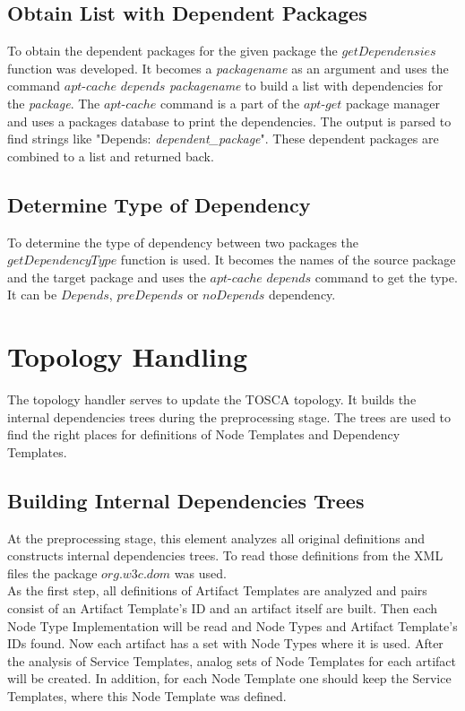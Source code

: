 \subsection*{Obtain List with Dependent Packages}
To obtain the dependent packages for the given package the $getDependensies$ function was developed.
It becomes a \emph{packagename} as an argument and uses the command $apt$-$cache$ $depends$ \emph{packagename} to build a list with dependencies for the \emph{package}. 
The $apt$-$cache$ command is a part of the $apt$-$get$ package manager and uses a packages database to print the dependencies.
The output is parsed to find strings like "Depends: \emph{dependent\_package}".
These dependent packages are combined to a list and returned back.

\subsection*{Determine Type of Dependency}
To determine the type of dependency between two packages the $getDependencyType$ function is used.
It becomes the names of the source package and the target package and uses the $apt$-$cache$ $depends$ command to get the type.
It can be $Depends$, $preDepends$ or $noDepends$ dependency.

\section{Topology Handling}\label{sec:imptophan}
The topology handler serves to update the TOSCA topology.
It builds the internal dependencies trees during the preprocessing stage.
The trees are used to find the right places for definitions of Node Templates and Dependency Templates.

\subsection*{Building Internal Dependencies Trees}
At the preprocessing stage, this element analyzes all original definitions and constructs internal dependencies trees. %
To read those definitions from the XML files the package $org$.$w3c$.$dom$ was used.\\
As the first step, all definitions of Artifact Templates are analyzed and pairs consist of an Artifact Template's ID and an artifact itself are built.
Then each Node Type Implementation will be read and Node Types and Artifact Template's IDs found. 
Now each artifact has a set with Node Types where it is used.
After the analysis of Service Templates, analog sets of Node Templates for each artifact will be created. 
In addition, for each Node Template one should keep the Service Templates, where this Node Template was defined.	

